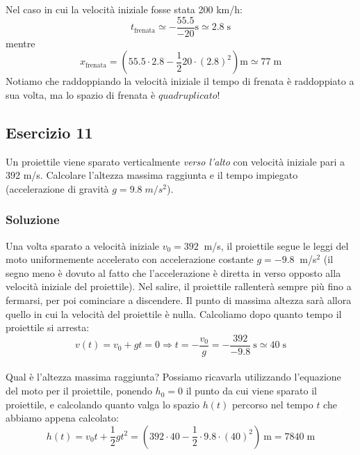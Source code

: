 \documentclass[12pt,a4paper]{book}
\begin{document}
Nel caso in cui la velocità iniziale fosse stata 200 km/h:
\begin{equation*}
t_{\text{frenata}}\simeq -\frac{55.5}{-20}\text{s}\simeq 2.8 \; \text{s}
\end{equation*}
mentre
\begin{equation*}
x_{\text{frenata}}=(55.5\cdot 2.8-\frac{1}{2} 20\cdot (2.8)^2)\text{m}\simeq 77 \; \text{m}
\end{equation*}
Notiamo che raddoppiando la velocità iniziale il tempo di frenata è raddoppiato a sua volta, ma lo spazio di frenata è $quadruplicato$!

\subsection*{Esercizio 11}
Un proiettile viene sparato verticalmente \textit{verso l'alto} con velocità iniziale pari a 392 m/s. Calcolare l'altezza massima raggiunta e il tempo impiegato (accelerazione di gravità $g = 9.8 \; m/s^2$).

\subsubsection*{Soluzione}
Una volta sparato a velocità iniziale $v_0 = 392 \:$ m/s, il proiettile segue le leggi del moto uniformemente accelerato con accelerazione costante $g=-9.8 \:$ m/s$^2$ (il segno meno è dovuto al fatto che l'accelerazione è diretta in verso opposto alla velocità iniziale del  proiettile). Nel salire, il proiettile rallenterà sempre più fino a fermarsi, per poi cominciare a discendere. Il punto di massima altezza sarà allora quello in cui la velocità del proiettile è nulla. Calcoliamo dopo quanto tempo il proiettile si arresta:\\
\begin{equation*}
v(t)= v_0 + g t =0 \Longrightarrow t= -\frac{v_0}{g}= -\frac{392}{- 9.8} \: \text{s} \simeq 40 \;  \text{s}
\end{equation*}\\
Qual è l'altezza massima raggiunta? Possiamo ricavarla utilizzando l'equazione del moto per il proiettile, ponendo $h_0 = 0$ il punto da cui viene sparato il proiettile, e calcolando quanto valga lo spazio $h(t)$ percorso nel tempo $t$ che abbiamo appena calcolato:\\
\begin{equation*}
h(t) = v_0 t + \frac{1}{2}g t^2 = \left( 392 \cdot 40 - \frac{1}{2} \cdot 9.8 \cdot (40)^2 \right) \: \text{m} = 7840 \; \text{m} 
\end{equation*}
\end{document}
